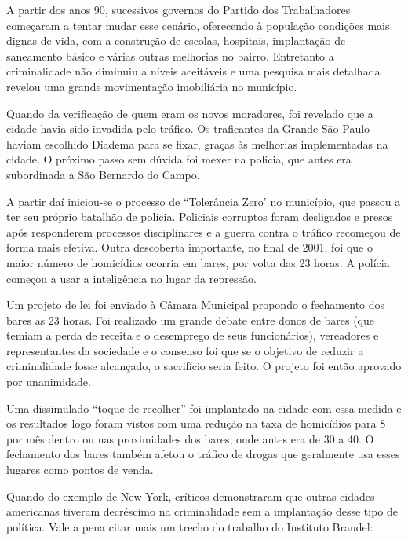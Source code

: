 \documentclass[
	12pt,				%
	openright,			%
	twoside,			%
	a4paper,			%
	chapter=TITLE,		%
	section=TITLE,		%
	subsection=TITLE,	%
	subsubsection=TITLE,%
	spanish,            %
	english,			%
	brazil				%
	]{abntex2}
\begin{document}
\par
A partir dos anos 90, sucessivos governos do Partido dos Trabalhadores começaram a tentar mudar esse cenário, oferecendo à população condições mais dignas de vida, com a construção de escolas, hospitais, implantação de saneamento básico e várias outras melhorias no bairro. Entretanto a criminalidade não diminuiu a níveis aceitáveis e uma pesquisa mais detalhada revelou uma grande movimentação imobiliária no município.
\par
Quando da verificação de quem eram os novos moradores, foi revelado que a cidade havia sido invadida pelo tráfico. Os traficantes da Grande São Paulo haviam escolhido Diadema para se fixar, graças às melhorias implementadas na cidade. O próximo passo sem dúvida foi mexer na polícia, que antes era subordinada a São Bernardo do Campo.
\par
A partir daí iniciou-se o processo de “Tolerância Zero' no município, que passou a ter seu próprio batalhão de polícia. Policiais corruptos foram desligados e presos após responderem processos disciplinares e a guerra contra o tráfico recomeçou de forma mais efetiva. Outra descoberta importante, no final de 2001, foi que o maior número de homicídios ocorria em bares, por volta das 23 horas. A polícia começou a usar a inteligência no lugar da repressão.
\par
Um projeto de lei foi enviado à Câmara Municipal propondo o fechamento dos bares as 23 horas. Foi realizado um grande debate entre donos de bares (que temiam a perda de receita e o desemprego de seus funcionários), vereadores e representantes da sociedade e o consenso foi que se o objetivo de reduzir a criminalidade fosse alcançado, o sacrifício seria feito. O projeto foi então aprovado por unanimidade. 
\par
Uma dissimulado “toque de recolher” foi implantado na cidade com essa medida e os resultados logo foram vistos com uma redução na taxa de homicídios para 8 por mês dentro ou nas proximidades dos bares, onde antes era de 30 a 40. O fechamento dos bares também afetou o tráfico de drogas que geralmente usa esses lugares como pontos de venda.
\par  
Quando do exemplo de New York, críticos demonstraram que outras cidades americanas tiveram decréscimo na criminalidade sem a implantação desse tipo de política. Vale a pena citar mais um trecho do trabalho do Instituto Braudel:
\end{document}
